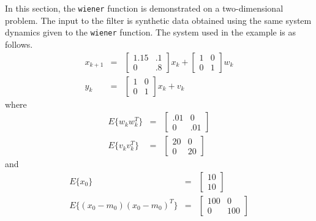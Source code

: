 	In this section, the {\tt wiener} function is demonstrated on
a two-dimensional problem.  The input to the filter is synthetic
data obtained using the same system dynamics given to the {\tt wiener}
function.  The system used in the example is as follows.
%
\begin{eqnarray}
x_{k+1}&=&\left[\begin{array}{cc}
              1.15 & .1\\
              0   & .8\end{array}\right]x_k+
         \left[\begin{array}{cc}
              1 & 0\\
              0 & 1\end{array}\right]w_k\nonumber\\
y_k&=&\left[\begin{array}{cc}
              1 & 0\\
              0 & 1\end{array}\right]x_k+v_k\nonumber
\end{eqnarray}
%
where
%
\begin{eqnarray}
E\{w_kw_k^T\}&=&\left[\begin{array}{cc}
              .01 & 0\\
              0 & .01\end{array}\right]\nonumber\\
E\{v_kv_k^T\}&=&\left[\begin{array}{cc}
              20 & 0\\
              0 & 20\end{array}\right]\nonumber
\end{eqnarray}
%
and
%
\begin{eqnarray}
E\{x_0\}&=&\left[\begin{array}{c}
              10\\
              10\end{array}\right]\nonumber\\
E\{(x_0-m_0)(x_0-m_0)^T\}&=&\left[\begin{array}{cc}
              100 & 0\\
              0 & 100\end{array}\right]\nonumber
\end{eqnarray}
%

